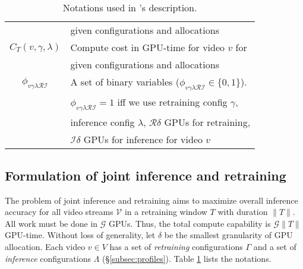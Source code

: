 \begin{table}[t!]
\begin{tabular}{cl}
                                       &given configurations and allocations\\%
   $C_T(v, \gamma, \lambda)$ & Compute cost in GPU-time for video $v$ for\\%
                                       &given configurations and allocations\\\hline%
   $\phi_{v\gamma\lambda\mathcal{R}\mathcal{I}}$ & A set of binary variables ($\phi_{v\gamma\lambda\mathcal{R}\mathcal{I}}\in\{0,1\}$). \\
   & $\phi_{v\gamma\lambda\mathcal{R}\mathcal{I}} = 1$ iff we use retraining config $\gamma$, \\
   &inference config $\lambda$, $\mathcal{R}\delta$ GPUs for retraining,\\
   & $\mathcal{I}\delta$ GPUs for inference for video $v$\\\hline
   \end{tabular}
   \caption{\label{tab:notations}Notations used in {\name}'s description.}
   \end{table}

\subsection{Formulation of joint inference and retraining}
\label{subsec:formulation}

The problem of joint inference and retraining aims to maximize overall inference accuracy for all video streams $\mathcal{V}$ in a retraining window ${T}$ with duration $\lVert T \rVert$. 
All work must be done in $\mathcal{G}$ GPUs.
Thus, the total compute capability is $\mathcal{G}\lVert T \rVert$ GPU-time. Without loss of generality, let $\delta$ be the smallest granularity of GPU allocation.  %
Each video $v \in V$ has a set of \emph{retraining} configurations $\Gamma$
and a set of \emph{inference} configurations $\Lambda$ (\S\ref{subsec:profiles}).
Table \ref{tab:notations} lists the notations. 


